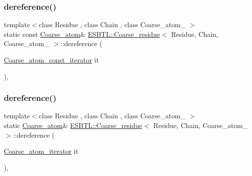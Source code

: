 \subsubsection{\texorpdfstring{dereference()}{dereference()}\hspace{0.1cm}{\footnotesize\ttfamily [1/2]}}
{\footnotesize\ttfamily template$<$class Residue , class Chain , class Coarse\+\_\+atom\+\_\+ $>$ \\
static const \hyperlink{classESBTL_1_1Coarse__residue_a4e83dc008345f6b828bcd3a67045a051}{Coarse\+\_\+atom}\& \hyperlink{classESBTL_1_1Coarse__residue}{E\+S\+B\+T\+L\+::\+Coarse\+\_\+residue}$<$ Residue, Chain, Coarse\+\_\+atom\+\_\+ $>$\+::dereference (\begin{DoxyParamCaption}\item[{\hyperlink{group__grp__iters_ga5a4a865846cdde342538df7fc03c80ce}{Coarse\+\_\+atom\+\_\+const\+\_\+iterator}}]{it }\end{DoxyParamCaption})\hspace{0.3cm}{\ttfamily [inline]}, {\ttfamily [static]}}

\mbox{\label{classESBTL_1_1Coarse__residue_aa3fa145ffbe14ab960c2baa41b6a0761}} 
\subsubsection{\texorpdfstring{dereference()}{dereference()}\hspace{0.1cm}{\footnotesize\ttfamily [2/2]}}
{\footnotesize\ttfamily template$<$class Residue , class Chain , class Coarse\+\_\+atom\+\_\+ $>$ \\
static \hyperlink{classESBTL_1_1Coarse__residue_a4e83dc008345f6b828bcd3a67045a051}{Coarse\+\_\+atom}\& \hyperlink{classESBTL_1_1Coarse__residue}{E\+S\+B\+T\+L\+::\+Coarse\+\_\+residue}$<$ Residue, Chain, Coarse\+\_\+atom\+\_\+ $>$\+::dereference (\begin{DoxyParamCaption}\item[{\hyperlink{group__grp__iters_ga09a38741d50d3b7296dae83eb0911e49}{Coarse\+\_\+atom\+\_\+iterator}}]{it }\end{DoxyParamCaption})\hspace{0.3cm}{\ttfamily [inline]}, {\ttfamily [static]}}

